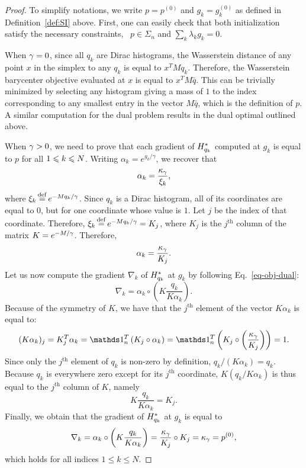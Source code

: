 \begin{proof}	
To simplify notations, we write $p=p^{(0)}$ and $g_k=g_k^{(0)}$ as defined in Definition~\ref{def:SI} above. First, one can easily check that both initialization satisfy the necessary constraints, \ie~$p\in\Sigma_n$ and $\sum_k \lambda_k g_k=0$.

When $\gamma=0$, since all $q_k$ are Dirac histograms, the Wasserstein distance of any point $x$ in the simplex to any $q_k$ is equal to $x^T M q_k$. Therefore, the Wasserstein barycenter objective evaluated at $x$ is equal to $x^T M \bar{q}$. This can be trivially minimized by selecting any histogram giving a mass of $1$ to the index corresponding to any smallest entry in the vector $M \bar{q}$, which is the definition of $p$. A similar computation for the dual problem results in the dual optimal outlined above.

When $\gamma>0$, we need to prove that each gradient of $H^*_{q_k}$ computed at $g_k$ is equal to $p$ for all $1 \leqslant k \leqslant N$. Writing $\alpha_k=e^{g_k/\gamma}$, we recover that 
$$\alpha_k = \frac{\kappa_\gamma}{\xi_k},$$ 
where $\xi_k\operatorname{\overset{\operatorname{def}}{=}} e^{-M q_k/\gamma}$. Since $q_k$ is a Dirac histogram, all of its coordinates are equal to $0$, but for one coordinate whose value is $1$. Let $j$ be the index of that coordinate. Therefore, $\xi_k\operatorname{\overset{\operatorname{def}}{=}} e^{-M q_k/\gamma}=K_j$, where $K_j$ is the $j^{\text{th}}$ column of the matrix $K=e^{-M/\gamma}$. Therefore,
$$\alpha_k = \frac{\kappa_\gamma}{K_j}.$$
Let us now compute the gradient $\nabla_k$ of $H^*_{q_k}$ at $g_k$ by following  Eq.~\eqref{eq-obj-dual}:
$$\nabla_k = \alpha_k\circ \left(K \frac{q_k}{K\alpha_k}\right).$$
Because of the symmetry of $K$, we have that the $j^{\text{th}}$ element of the vector $K\alpha_k$ is equal to:
$$ (K\alpha_k)_j = K_j^T \alpha_k= \ones_\n^T \left( K_j \circ \alpha_k\right)= \ones_\n^T \left( K_j \circ \left(\frac{\kappa_\ga}{K_j}\right)\right)= 1.$$ 
Since only the $j^{\text{th}}$ element of $q_k$ is non-zero by definition, $q_k/(K\alpha_k)=q_k$.
Because $q_k$ is everywhere zero except for its $j^{\text{th}}$ coordinate, $K(q_k/K\alpha_k)$ is thus equal to the $j^\text{th}$ column of $K$, namely 
$$K\frac{q_k}{K\alpha_k}=K_j.$$
Finally, we obtain that the gradient of $H^*_{q_k}$ at $g_k$ is equal to 
$$\nabla_k = \alpha_k\circ \left(K \frac{q_k}{K\alpha_k}\right)=  \frac{\kappa_\gamma}{K_j} \circ K_j =\kappa_\gamma=p^{(0)},$$
which holds for all indices $1\leq k\leq N$.
\end{proof}











